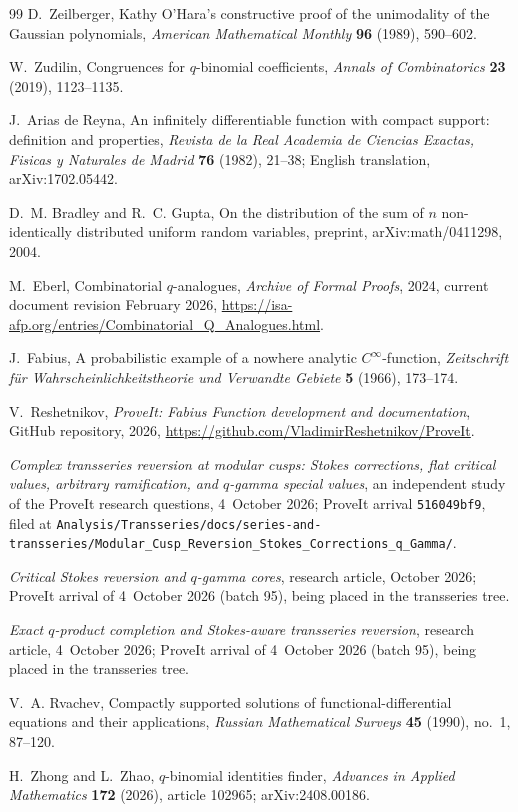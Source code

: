 \documentclass[11pt,a4paper,oneside,openany]{book}
\theoremstyle{definition}
\theoremstyle{remark}
\begin{document}
\begin{thebibliography}{99}
D.~Zeilberger,
Kathy O'Hara's constructive proof of the unimodality of the Gaussian polynomials,
\emph{American Mathematical Monthly} \textbf{96} (1989), 590--602.

W.~Zudilin,
Congruences for $q$-binomial coefficients,
\emph{Annals of Combinatorics} \textbf{23} (2019), 1123--1135.

J.~Arias de Reyna,
An infinitely differentiable function with compact support: definition and properties,
\emph{Revista de la Real Academia de Ciencias Exactas, Fisicas y Naturales de Madrid} \textbf{76} (1982), 21--38;
English translation, arXiv:1702.05442.

D.~M. Bradley and R.~C. Gupta,
On the distribution of the sum of $n$ non-identically distributed uniform random variables,
preprint, arXiv:math/0411298, 2004.

M.~Eberl,
Combinatorial $q$-analogues,
\emph{Archive of Formal Proofs}, 2024, current document revision February 2026,
\url{https://isa-afp.org/entries/Combinatorial_Q_Analogues.html}.

J.~Fabius,
A probabilistic example of a nowhere analytic $C^\infty$-function,
\emph{Zeitschrift f\"ur Wahrscheinlichkeitstheorie und Verwandte Gebiete} \textbf{5} (1966), 173--174.

V.~Reshetnikov,
\emph{ProveIt: Fabius Function development and documentation},
GitHub repository, 2026,
\url{https://github.com/VladimirReshetnikov/ProveIt}.

\emph{Complex transseries reversion at modular cusps: Stokes corrections, flat
critical values, arbitrary ramification, and $q$-gamma special values},
an independent study of the ProveIt research questions, 4~October 2026;
ProveIt arrival \texttt{516049bf9}, filed at
\nolinkurl{Analysis/Transseries/docs/series-and-transseries/Modular_Cusp_Reversion_Stokes_Corrections_q_Gamma/}.

\emph{Critical Stokes reversion and $q$-gamma cores},
research article, October 2026; ProveIt arrival of 4~October 2026 (batch 95),
being placed in the transseries tree.

\emph{Exact $q$-product completion and Stokes-aware transseries reversion},
research article, 4~October 2026; ProveIt arrival of 4~October 2026
(batch 95), being placed in the transseries tree.

V.~A. Rvachev,
Compactly supported solutions of functional-differential equations and their applications,
\emph{Russian Mathematical Surveys} \textbf{45} (1990), no.~1, 87--120.

H.~Zhong and L.~Zhao,
$q$-binomial identities finder,
\emph{Advances in Applied Mathematics} \textbf{172} (2026), article 102965;
arXiv:2408.00186.

\end{thebibliography}

\printindex
\end{document}
